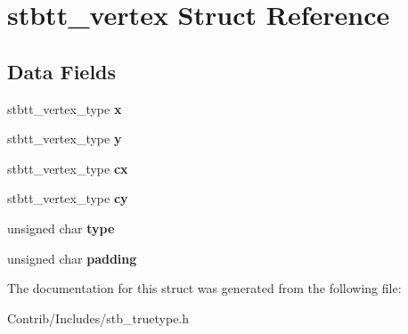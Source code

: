 \hypertarget{structstbtt__vertex}{}\section{stbtt\+\_\+vertex Struct Reference}
\label{structstbtt__vertex}
\subsection*{Data Fields}
\begin{DoxyCompactItemize}
\item 
stbtt\+\_\+vertex\+\_\+type {\bfseries x}\hypertarget{structstbtt__vertex_a7d9fb6cbf79cffc4d4dd2df2234936e3}{}\label{structstbtt__vertex_a7d9fb6cbf79cffc4d4dd2df2234936e3}

\item 
stbtt\+\_\+vertex\+\_\+type {\bfseries y}\hypertarget{structstbtt__vertex_af360f5b2ddeafbacb414e37375921717}{}\label{structstbtt__vertex_af360f5b2ddeafbacb414e37375921717}

\item 
stbtt\+\_\+vertex\+\_\+type {\bfseries cx}\hypertarget{structstbtt__vertex_a1e3efc69bd70ecb9c0905d4ec436eb06}{}\label{structstbtt__vertex_a1e3efc69bd70ecb9c0905d4ec436eb06}

\item 
stbtt\+\_\+vertex\+\_\+type {\bfseries cy}\hypertarget{structstbtt__vertex_af61b735798cf434de22b740898d1a20c}{}\label{structstbtt__vertex_af61b735798cf434de22b740898d1a20c}

\item 
unsigned char {\bfseries type}\hypertarget{structstbtt__vertex_aa5044999f3339d2ba3b1bf22fa6cfe95}{}\label{structstbtt__vertex_aa5044999f3339d2ba3b1bf22fa6cfe95}

\item 
unsigned char {\bfseries padding}\hypertarget{structstbtt__vertex_af390d07a689413f6e399daf07bfbd14f}{}\label{structstbtt__vertex_af390d07a689413f6e399daf07bfbd14f}

\end{DoxyCompactItemize}


The documentation for this struct was generated from the following file\+:\begin{DoxyCompactItemize}
\item 
Contrib/\+Includes/stb\+\_\+truetype.\+h\end{DoxyCompactItemize}
